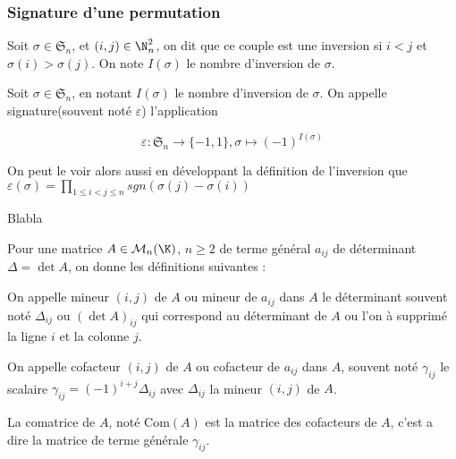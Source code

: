 \subsubsection{Signature d'une permutation}
\begin{defini}[Inversion]
    Soit $\sigma\in\mathfrak{S}_n$, et $(i,j)\in \N_n^2$, on dit que ce couple est une inversion si $i<j$ et $\sigma(i)>\sigma(j)$. On note $I(\sigma)$ le nombre d'inversion de $\sigma$.
\end{defini}
\begin{defini}
    Soit $\sigma\in\mathfrak{S}_n$, en notant $I(\sigma)$ le nombre d'inversion de $\sigma$. On appelle signature(souvent noté $\varepsilon$) l'application

    $$\varepsilon : \mathfrak{S}_n\to\{-1,1\},\sigma\mapsto(-1)^{I(\sigma)}$$

    On peut le voir alors aussi en développant la définition de l'inversion que $\varepsilon(\sigma)=\prod_{1\leq i <j\leq n}sgn(\sigma(j)-\sigma(i))$
\end{defini}
\begin{theoreme}
    Blabla
\end{theoreme}
Pour une matrice $A\in\mathcal{M}_n(\K)$, $n\geq2$ de terme général $a_{ij}$ de déterminant $\Delta=\det A$, on donne les définitions suivantes :
\begin{defini}
On appelle mineur $(i,j)$ de $A$ ou mineur de $a_{ij}$ dans $A$ le déterminant souvent noté $\Delta_{ij}$ ou $(\det A)_{ij}$ qui correspond au déterminant de $A$ ou l'on à supprimé la ligne $i$ et la colonne $j$.
\end{defini}
\begin{defini}
On appelle cofacteur $(i,j)$ de $A$ ou  cofacteur de $a_{ij}$ dans $A$, souvent noté $\gamma_{ij}$ le scalaire  $\gamma_{ij}=(-1)^{i+j}\Delta_{ij}$ avec $\Delta_{ij}$ la mineur $(i,j)$ de $A$.
\end{defini}
\begin{defini}
La comatrice de $A$, noté $\text{Com}(A)$ est la matrice des cofacteurs de $A$, c'est a dire la matrice de terme générale $\gamma_{ij}$.
\end{defini}
